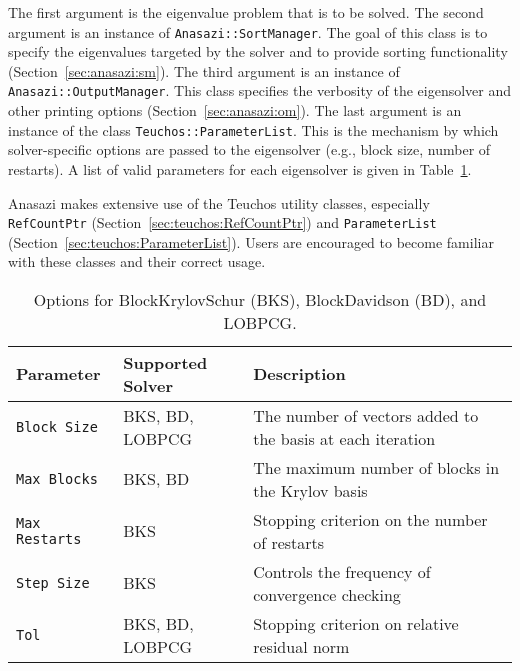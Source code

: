 The first argument is the eigenvalue problem that is to be solved. The second
argument is an instance of \verb!Anasazi::SortManager!. The goal of this class is
to specify the eigenvalues targeted by the solver and to provide sorting
functionality (Section~\ref{sec:anasazi:sm}). The third argument is an instance
of \verb!Anasazi::OutputManager!. This class specifies the verbosity of the
eigensolver and other printing options (Section~\ref{sec:anasazi:om}). The last
argument is an instance of the class \verb!Teuchos::ParameterList!. This is the
mechanism by which solver-specific options are passed to the eigensolver (e.g.,
block size, number of restarts). A list of valid parameters for each
eigensolver is given in Table~\ref{tab:anasazi:solver_params}.

\begin{remark}
Anasazi makes extensive use of the Teuchos utility classes, especially
\verb!RefCountPtr! (Section~\ref{sec:teuchos:RefCountPtr}) and
\verb!ParameterList! (Section~\ref{sec:teuchos:ParameterList}). Users
are encouraged to become familiar with these classes and their correct
usage.
\end{remark}

\begin{table}
\begin{center}
\begin{tabular}{| l | l | p{6cm} |}
\hline
Parameter & Supported Solver & Description \\
\hline
{\tt Block Size}   & BKS, BD, LOBPCG & The number of vectors added to the basis at each iteration \\
{\tt Max Blocks}   & BKS, BD         & The maximum number of blocks in the Krylov basis \\
{\tt Max Restarts} & BKS             & Stopping criterion on the number of restarts \\
{\tt Step Size}    & BKS             & Controls the frequency of convergence checking \\
{\tt Tol}          & BKS, BD, LOBPCG & Stopping criterion on relative residual norm \\
\hline
\end{tabular}
\caption{Options for BlockKrylovSchur (BKS), BlockDavidson (BD), and LOBPCG.}
\label{tab:anasazi:solver_params}
\end{center}
\end{table}

